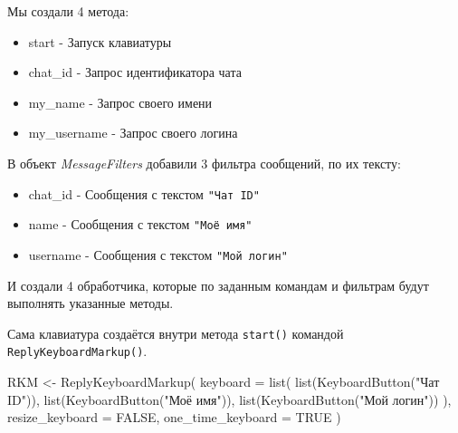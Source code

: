 \documentclass[
]{book}
\newenvironment{Shaded}{\begin{snugshade}}{\end{snugshade}}
\newcommand{\AttributeTok}[1]{\textcolor[rgb]{0.77,0.63,0.00}{#1}}
\newcommand{\CommentTok}[1]{\textcolor[rgb]{0.56,0.35,0.01}{\textit{#1}}}
\newcommand{\ConstantTok}[1]{\textcolor[rgb]{0.00,0.00,0.00}{#1}}
\newcommand{\FunctionTok}[1]{\textcolor[rgb]{0.00,0.00,0.00}{#1}}
\newcommand{\NormalTok}[1]{#1}
\newcommand{\OtherTok}[1]{\textcolor[rgb]{0.56,0.35,0.01}{#1}}
\newcommand{\SpecialCharTok}[1]{\textcolor[rgb]{0.00,0.00,0.00}{#1}}
\newcommand{\StringTok}[1]{\textcolor[rgb]{0.31,0.60,0.02}{#1}}
\providecommand{\tightlist}{%
  \setlength{\itemsep}{0pt}\setlength{\parskip}{0pt}}
\begin{document}
Мы создали 4 метода:

\begin{itemize}
\tightlist
\item
  start - Запуск клавиатуры
\item
  chat\_id - Запрос идентификатора чата
\item
  my\_name - Запрос своего имени
\item
  my\_username - Запрос своего логина
\end{itemize}

В объект \emph{MessageFilters} добавили 3 фильтра сообщений, по их тексту:

\begin{itemize}
\tightlist
\item
  chat\_id - Сообщения с текстом \texttt{"Чат\ ID"}
\item
  name - Сообщения с текстом \texttt{"Моё\ имя"}
\item
  username - Сообщения с текстом \texttt{"Мой\ логин"}
\end{itemize}

И создали 4 обработчика, которые по заданным командам и фильтрам будут выполнять указанные методы.

\begin{Shaded}
\end{Shaded}

Сама клавиатура создаётся внутри метода \texttt{start()} командой \texttt{ReplyKeyboardMarkup()}.

\begin{Shaded}
\begin{Highlighting}[]
\NormalTok{RKM }\OtherTok{\textless{}{-}} \FunctionTok{ReplyKeyboardMarkup}\NormalTok{(}
    \AttributeTok{keyboard =} \FunctionTok{list}\NormalTok{(}
      \FunctionTok{list}\NormalTok{(}\FunctionTok{KeyboardButton}\NormalTok{(}\StringTok{"Чат ID"}\NormalTok{)),}
      \FunctionTok{list}\NormalTok{(}\FunctionTok{KeyboardButton}\NormalTok{(}\StringTok{"Моё имя"}\NormalTok{)),}
      \FunctionTok{list}\NormalTok{(}\FunctionTok{KeyboardButton}\NormalTok{(}\StringTok{"Мой логин"}\NormalTok{))}
\NormalTok{    ),}
    \AttributeTok{resize\_keyboard =} \ConstantTok{FALSE}\NormalTok{,}
    \AttributeTok{one\_time\_keyboard =} \ConstantTok{TRUE}
\NormalTok{)}
\end{Highlighting}
\end{Shaded}
\end{document}
